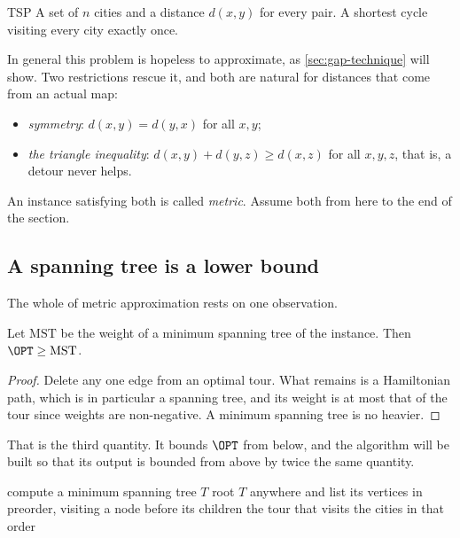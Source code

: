 \begin{probdef}{TSP}
  \instance A set of $n$ cities and a distance $d(x,y)$ for every pair.
  \question A shortest cycle visiting every city exactly once.
\end{probdef}

In general this problem is hopeless to approximate, as \cref{sec:gap-technique}
will show. Two restrictions rescue it, and both are natural for distances that
come from an actual map:
\begin{itemize}[nosep,leftmargin=*]
  \item \emph{symmetry}: $d(x,y) = d(y,x)$ for all $x,y$;
  \item \emph{the triangle inequality}: $d(x,y) + d(y,z) \ge d(x,z)$ for all
        $x,y,z$, that is, a detour never helps.
\end{itemize}
An instance satisfying both is called \emph{metric}. Assume both from here to
the end of the section.

\subsection{A spanning tree is a lower bound}

The whole of metric  approximation rests on one observation.

\begin{lemma}\label{lem:tsp-mst-lower-bound}
Let $\mathrm{MST}$ be the weight of a minimum spanning tree of the instance.
Then $\OPT \ge \mathrm{MST}$.
\end{lemma}

\begin{proof}
Delete any one edge from an optimal tour. What remains is a Hamiltonian path,
which is in particular a spanning tree, and its weight is at most that of the
tour since weights are non-negative. A minimum spanning tree is no heavier.
\end{proof}

That is the third quantity. It bounds $\OPT$ from below, and the algorithm will
be built so that its output is bounded from above by twice the same quantity.

\begin{algorithm}[ht]
\caption{Double-tree $2$-approximation for metric }
\label{alg:tsp-double-tree}
\begin{algorithmic}[1]
  \State compute a minimum spanning tree $T$
  \State root $T$ anywhere and list its vertices in preorder, visiting a node
         before its children
  \State \Return the tour that visits the cities in that order
\end{algorithmic}
\end{algorithm}

